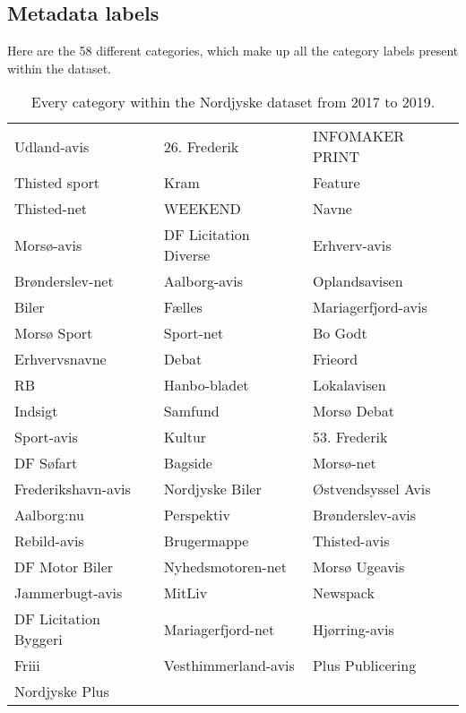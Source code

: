 \subsection{Metadata labels}\label{sec:appendix_meta_data}
Here are the 58 different categories, which make up all the category labels present within the dataset.

\begin{table}[h]
	\centering
	\begin{tabular}{l|l|l}
		Udland-avis	& 26. Frederik & INFOMAKER PRINT \\
		Thisted sport & Kram & Feature \\
		Thisted-net & WEEKEND & Navne \\
		Morsø-avis & DF Licitation Diverse & Erhverv-avis \\
		Brønderslev-net & Aalborg-avis & Oplandsavisen \\
		Biler & Fælles & Mariagerfjord-avis \\
		Morsø Sport & Sport-net & Bo Godt \\
		Erhvervsnavne & Debat & Frieord \\
		RB & Hanbo-bladet & Lokalavisen \\
		Indsigt & Samfund & Morsø Debat \\
		Sport-avis & Kultur & 53. Frederik \\
		DF Søfart & Bagside & Morsø-net \\
		Frederikshavn-avis & Nordjyske Biler & Østvendsyssel Avis \\
		Aalborg:nu & Perspektiv & Brønderslev-avis \\
		Rebild-avis & Brugermappe & Thisted-avis \\
		DF Motor Biler & Nyhedsmotoren-net & Morsø Ugeavis \\
		Jammerbugt-avis & MitLiv & Newspack \\
		DF Licitation Byggeri & Mariagerfjord-net & Hjørring-avis \\
		Friii & Vesthimmerland-avis & Plus Publicering \\
		Nordjyske Plus & & \\
	\end{tabular}
	\caption{Every category within the Nordjyske dataset from 2017 to 2019.}
	\label{tab:category_table}
\end{table}
